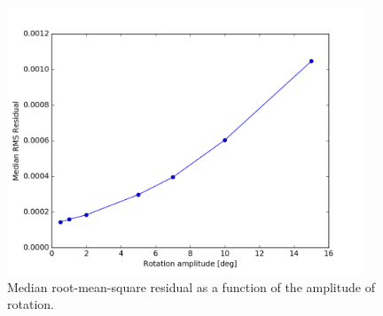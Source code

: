 \documentclass[12pt, preprint]{aastex}
\begin{document}
\begin{figure}[p]
\begin{center}
\includegraphics[width=0.95\textwidth]{rotation}
\end{center}
\caption{
\label{rotation_rms}
 Median root-mean-square residual as a function of the amplitude of rotation.
}
\end{figure}
\end{document}
